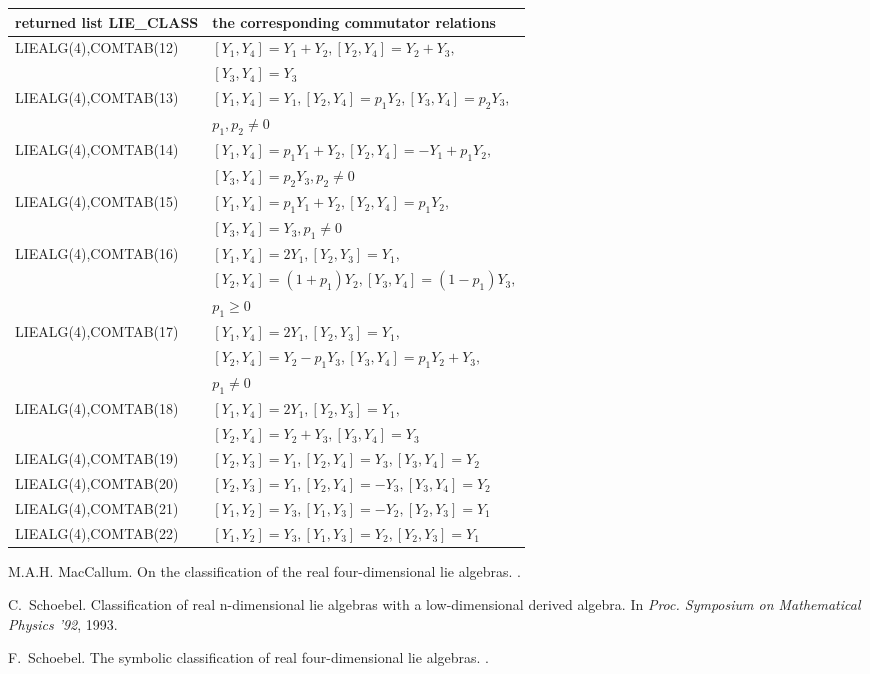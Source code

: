 \hspace*{0.3cm}\begin{tabular}{l|l}returned list LIE\_CLASS&
the corresponding commutator relations\\[0.1cm]\hline
{LIEALG(4),COMTAB(12)}&$[Y_1,Y_4]=Y_1+Y_2,[Y_2,Y_4]=Y_2+Y_3,$\\
                      &$[Y_3,Y_4]=Y_3$\\[0.1cm]
{LIEALG(4),COMTAB(13)}&$[Y_1,Y_4]=Y_1,[Y_2,Y_4]=p_1 Y_2,[Y_3,Y_4]=p_2 Y_3,$\\
                      &$p_1,p_2\neq 0$\\[0.1cm]
{LIEALG(4),COMTAB(14)}&$[Y_1,Y_4]=p_1 Y_1+Y_2,[Y_2,Y_4]=-Y_1+p_1 Y_2,$\\
                      &$[Y_3,Y_4]=p_2 Y_3,p_2\neq 0$\\[0.1cm]
{LIEALG(4),COMTAB(15)}&$[Y_1,Y_4]=p_1 Y_1+Y_2,[Y_2,Y_4]=p_1 Y_2,$\\
                      &$[Y_3,Y_4]=Y_3,p_1\neq 0$\\[0.1cm]
{LIEALG(4),COMTAB(16)}&$[Y_1,Y_4]=2 Y_1,[Y_2,Y_3]=Y_1,$\\
                      &$[Y_2,Y_4]=(1+p_1) Y_2,[Y_3,Y_4]=(1-p_1) Y_3,$\\
                      &$p_1\geq 0$\\[0.1cm]
{LIEALG(4),COMTAB(17)}&$[Y_1,Y_4]=2 Y_1,[Y_2,Y_3]=Y_1,$\\
                      &$[Y_2,Y_4]=Y_2-p_1 Y_3,[Y_3,Y_4]=p_1 Y_2+Y_3,$\\
                      &$p_1\neq 0$\\[0.1cm]
{LIEALG(4),COMTAB(18)}&$[Y_1,Y_4]=2 Y_1,[Y_2,Y_3]=Y_1,$\\
                      &$[Y_2,Y_4]=Y_2+Y_3,[Y_3,Y_4]=Y_3$\\[0.1cm]
{LIEALG(4),COMTAB(19)}&$[Y_2,Y_3]=Y_1,[Y_2,Y_4]=Y_3,[Y_3,Y_4]=Y_2$\\[0.1cm]
{LIEALG(4),COMTAB(20)}&$[Y_2,Y_3]=Y_1,[Y_2,Y_4]=-Y_3,[Y_3,Y_4]=Y_2$\\[0.1cm]
{LIEALG(4),COMTAB(21)}&$[Y_1,Y_2]=Y_3,[Y_1,Y_3]=-Y_2,[Y_2,Y_3]=Y_1$\\[0.1cm]
{LIEALG(4),COMTAB(22)}&$[Y_1,Y_2]=Y_3,[Y_1,Y_3]=Y_2,[Y_2,Y_3]=Y_1$
\end{tabular}


\begin{thebibliography}{1}

M.A.H. MacCallum.
\newblock On the classification of the real four-dimensional lie algebras.
.

C.~Schoebel.
\newblock Classification of real n-dimensional lie algebras with a
  low-dimensional derived algebra.
\newblock In {\em Proc. {Symposium on Mathematical Physics} '92}, 1993.

F.~Schoebel.
\newblock The symbolic classification of real four-dimensional lie algebras.
.

\end{thebibliography}

